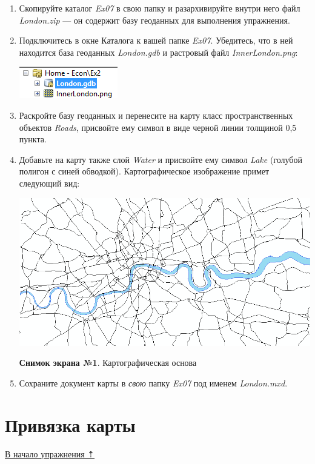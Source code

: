 \documentclass[12pt,]{book}
\begin{document}
\begin{enumerate}
\def\labelenumi{\arabic{enumi}.}
\item
  Скопируйте каталог \emph{Ex07} в свою папку и разархивируйте внутри него файл \emph{London.zip} --- он содержит базу геоданных для выполнения упражнения.
\item
  Подключитесь в окне Каталога к вашей папке \emph{Ex07}. Убедитесь, что в ней находится база геоданных \emph{London.gdb} и растровый файл \emph{InnerLondon.png}:

  \includegraphics{images/Ex07/image6.png}
\item
  Раскройте базу геоданных и перенесите на карту класс пространственных объектов \emph{Roads}, присвойте ему символ в виде черной линии толщиной 0,5 пункта.
\item
  Добавьте на карту также слой \emph{Water} и присвойте ему символ \emph{Lake} (голубой полигон с синей обводкой). Картографическое изображение примет следующий вид:

  \includegraphics{images/Ex07/image7.png}

  \textbf{Снимок экрана №1}. Картографическая основа
\item
  Сохраните документ карты в \emph{свою} папку \emph{Ex07} под именем \emph{London.mxd}.
\end{enumerate}

\hypertarget{map-ref-economic-referencing}{%
\section{Привязка карты}\label{map-ref-economic-referencing}}

\protect\hyperlink{map-ref-economic}{В начало упражнения ⇡}
\end{document}

